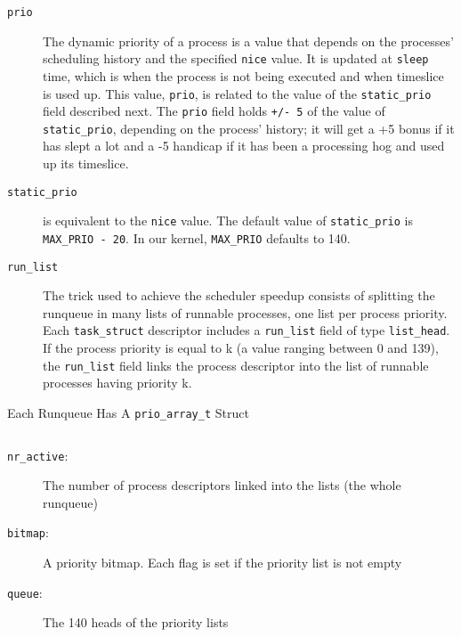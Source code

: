 \begin{description}
\item[\texttt{prio}] The dynamic priority of a process is a value that depends on the
  processes' scheduling history and the specified \texttt{nice} value. It is updated at
  \texttt{sleep} time, which is when the process is not being executed and when timeslice is
  used up. This value, \texttt{prio}, is related to the value of the \texttt{static\_prio}
  field described next. The \texttt{prio} field holds \texttt{+/- 5} of the value of
  \texttt{static\_prio}, depending on the process' history; it will get a +5 bonus if it has
  slept a lot and a -5 handicap if it has been a processing hog and used up its
  timeslice. 
\item[\texttt{static\_prio}] is equivalent to the \texttt{nice} value. The default value of
  \texttt{static\_prio} is \texttt{MAX\_PRIO - 20}. In our kernel, \texttt{MAX\_PRIO} defaults
  to 140. 
\item[\texttt{run\_list}] The trick used to achieve the scheduler speedup consists of
  splitting the runqueue in many lists of runnable processes, one list per process
  priority. Each \texttt{task\_struct} descriptor includes a \texttt{run\_list} field of type
  \texttt{list\_head}. If the process priority is equal to k (a value ranging between 0 and
  139), the \texttt{run\_list} field links the process descriptor into the list of runnable
  processes having priority k. 
\end{description}

\begin{frame}[fragile=singleslide]{Each Runqueue Has A \texttt{prio\_array\_t} Struct}
  \begin{center}
    \begin{minipage}{.8\textwidth}
      \inputminted{c}{../figs/prio-array-t.c}
    \end{minipage}
  \end{center}
  \begin{description}
  \item[\texttt{nr\_active}:] The number of process descriptors linked into the lists (the
    whole runqueue)
  \item[\texttt{bitmap}:] A priority bitmap. Each flag is set if the priority list is not
    empty
  \item[\texttt{queue}:] The 140 heads of the priority lists
  \end{description}
\end{frame}

